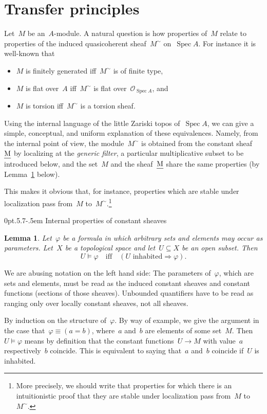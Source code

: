 \documentclass[10pt,reqno,a4paper]{amsbook}
\makeatletter
\theoremstyle{definition}
\theoremstyle{plain}
\newtheorem{lemma}[defn]{Lemma}
\theoremstyle{remark}
\renewcommand{\O}{\mathcal{O}}
\let\oldul\ul
\renewcommand{\ul}[1]{\text{\oldul{$#1$}}}
\DeclareMathOperator{\Spec}{Spec}
\newcommand{\?}{\,{:}\,}
\renewcommand{\_}{\mathpunct{.}\,}
\renewenvironment{proof}[1][\proofname]{\par
  \pushQED{\qed}%
  \normalfont \topsep6\p@\@plus6\p@\relax
  \trivlist
  \item[\hskip\labelsep
        \itshape
    #1\@addpunct{.}]\ignorespaces
}{%
  \popQED\endtrivlist\@endpefalse
}
\def\subsection{\@startsection{subsection}{2}%
  {0pt}{.5\linespacing\@plus.7\linespacing}{-.5em}%
  {\normalfont\bfseries}}
\makeatother
\begin{document}
\section{Transfer principles}
\label{sect:transfer-principles}

Let~$M$ be an~$A$-module. A natural question is how properties of~$M$
relate to properties of the induced quasicoherent sheaf~$M^\sim$
on~$\Spec A$. For instance it is well-known that
\begin{itemize}
\item $M$ is finitely generated iff~$M^\sim$ is of finite type,
\item $M$ is flat over~$A$ iff~$M^\sim$ is flat over~$\O_{\Spec A}$, and
\item $M$ is torsion iff~$M^\sim$ is a torsion sheaf.
\end{itemize}
Using the internal language of the little Zariski topos of~$\Spec A$, we can
give a simple, conceptual, and uniform explanation of these equivalences.
Namely, from the internal point of view, the module~$M^\sim$ is obtained from
the constant sheaf~$\ul{M}$ by localizing at the \emph{generic filter}, a
particular multiplicative subset to be introduced below, and the set~$M$ and
the sheaf~$\ul{M}$ share the same properties (by
Lemma~\ref{lemma:properties-of-constant-sheaves} below).

This makes it obvious that, for instance, properties which are stable under
localization pass from~$M$ to~$M^\sim$.\footnote{More precisely, we should
write that properties for which there is an intuitionistic proof that they are
stable under localization pass from~$M$ to~$M^\sim$.}


\subsection{Internal properties of constant sheaves}

\begin{lemma}\label{lemma:properties-of-constant-sheaves}Let~$\varphi$ be a
formula in which arbitrary sets and elements may occur as parameters. Let~$X$
be a topological space and let~$U \subseteq X$ be an open subset. Then
\[ U \models \varphi \quad\text{iff}\quad (\text{$U$ inhabited} \Rightarrow
\varphi). \]
\end{lemma}
We are abusing notation on the left hand side: The parameters
of~$\varphi$, which are sets and elements, must be read as the induced constant
sheaves and constant functions (sections of those sheaves).
Unbounded quantifiers have to be read as ranging only over locally constant
sheaves, not all sheaves.
\begin{proof}By induction on the structure of~$\varphi$. By way of example, we
give the argument in the case that~$\varphi \equiv (a = b)$, where~$a$ and~$b$ are
elements of some set~$M$. Then~$U \models \varphi$ means by definition that the
constant functions~$U \to M$ with value~$a$ respectively~$b$ coincide. This is
equivalent to saying that~$a$ and~$b$ coincide if~$U$ is inhabited.
\end{proof}
\end{document}
